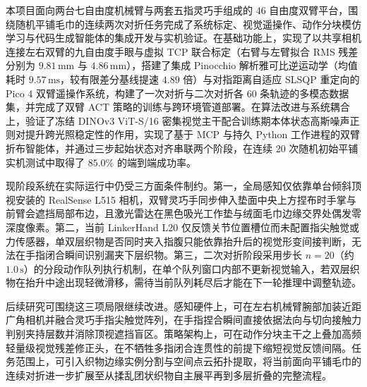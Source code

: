 本项目面向两台七自由度机械臂与两套五指灵巧手组成的 46 自由度双臂平台，围绕随机平铺毛巾的连续两次对折任务完成了系统标定、视觉遥操作、动作分块模仿学习与代码生成智能体的集成开发与实机验证。在基础功能上，实现了以共享相机连接左右双臂的九自由度手眼与虚拟 TCP 联合标定（右臂与左臂拟合 RMS 残差分别为 $9.81\,\mathrm{mm}$ 与 $4.86\,\mathrm{mm}$），搭建了集成 Pinocchio 解析雅可比逆运动学（均值耗时 $9.57\,\mathrm{ms}$，较有限差分基线提速 $4.89$ 倍）与对指距离自适应 SLSQP 重定向的 Pico 4 双臂遥操作系统，构建了一次对折与二次对折各 60 条轨迹的多模态数据集，并完成了双臂 ACT 策略的训练与跨环境管道部署。在算法改进与系统耦合上，验证了冻结 DINOv3 ViT-S/16 密集视觉主干配合训练期本体状态高斯噪声正则对提升跨光照稳定性的作用，实现了基于 MCP 与持久 Python 工作进程的双臂折布智能体，并通过三步起始状态对齐串联两个阶段，在连续 20 次随机初始平铺实机测试中取得了 $85.0\%$ 的端到端成功率。

现阶段系统在实际运行中仍受三方面条件制约。第一，全局感知仅依靠单台倾斜顶视安装的 RealSense L515 相机，双臂灵巧手同步伸入垫面中央上方捏布时手掌与前臂会遮挡局部布边，且激光雷达在黑色吸光工作垫与绒面毛巾边缘交界处偶发零深度像素。第二，当前 LinkerHand L20 仅反馈关节位置槽位而未配置指尖触觉或力传感器，单双层织物是否同时夹入指腹只能依靠抬升后的视觉形变间接判断，无法在手指闭合瞬间识别漏夹下层织物。第三，二次对折阶段采用步长 $n=20$（约 $1.0\,\mathrm{s}$）的分段动作队列执行机制，在单个队列窗口内部不更新视觉输入，若双层织物在抬升中途出现轻微滑移，需待当前队列耗尽后才能在下一轮推理中调整轨迹。

后续研究可围绕这三项局限继续改进。感知硬件上，可在左右机械臂腕部加装近距广角相机并融合灵巧手指尖触觉阵列，在手指捏合瞬间直接依据法向与切向接触力判别夹持层数并消除顶视遮挡盲区。策略架构上，可在动作分块主干之上叠加高频轻量级视觉残差修正头，在不牺牲多指闭合连贯性的前提下缩短视觉反馈间隔。任务范围上，可引入织物边缘实例分割与空间点云拓扑提取，将当前面向平铺毛巾的连续对折进一步扩展至从揉乱团状织物自主展平再到多层折叠的完整流程。
